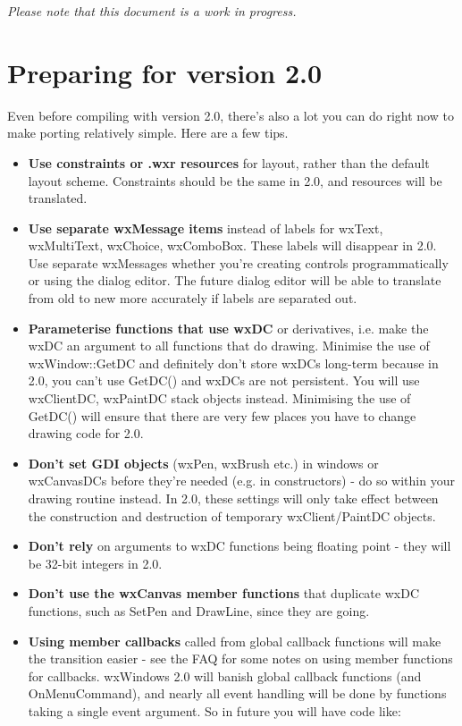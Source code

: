 {\it Please note that this document is a work in progress.}

\chapter{Preparing for version 2.0}\label{preparing}

Even before compiling with version 2.0, there's also a lot you can do right now to make porting
relatively simple. Here are a few tips.

\begin{itemize}
\item {\bf Use constraints or .wxr resources} for layout, rather than the default layout scheme.
Constraints should be the same in 2.0, and resources will be translated.
\item {\bf Use separate wxMessage items} instead of labels for wxText, wxMultiText,
wxChoice, wxComboBox. These labels will disappear in 2.0. Use separate
wxMessages whether you're creating controls programmatically or using
the dialog editor. The future dialog editor will be able to translate
from old to new more accurately if labels are separated out.
\item {\bf Parameterise functions that use wxDC} or derivatives, i.e. make the wxDC
an argument to all functions that do drawing. Minimise the use of
wxWindow::GetDC and definitely don't store wxDCs long-term
because in 2.0, you can't use GetDC() and wxDCs are not persistent.
You will use wxClientDC, wxPaintDC stack objects instead. Minimising
the use of GetDC() will ensure that there are very few places you
have to change drawing code for 2.0.
\item {\bf Don't set GDI objects} (wxPen, wxBrush etc.) in windows or wxCanvasDCs before they're
needed (e.g. in constructors) - do so within your drawing routine instead. In
2.0, these settings will only take effect between the construction and destruction
of temporary wxClient/PaintDC objects.
\item {\bf Don't rely} on arguments to wxDC functions being floating point - they will
be 32-bit integers in 2.0.
\item {\bf Don't use the wxCanvas member functions} that duplicate wxDC functions, such as SetPen and DrawLine, since
they are going.
\item {\bf Using member callbacks} called from global callback functions will make the transition
easier - see the FAQ
for some notes on using member functions for callbacks. wxWindows 2.0 will banish global
callback functions (and OnMenuCommand), and nearly all event handling will be done by functions taking a single event argument.
So in future you will have code like:


\end{itemize}
